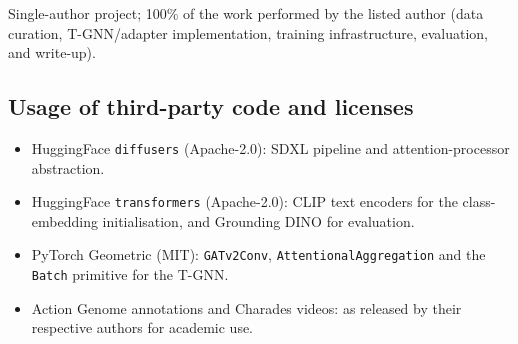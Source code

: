 \documentclass[11pt]{article}
\begin{document}
Single-author project; 100\% of the work performed by the
listed author (data curation, T-GNN/adapter implementation, training
infrastructure, evaluation, and write-up).

\subsection{Usage of third-party code and licenses}
\begin{itemize}[leftmargin=2em,itemsep=0.5pt]
\item HuggingFace \texttt{diffusers} (Apache-2.0): SDXL pipeline and
attention-processor abstraction.
\item HuggingFace \texttt{transformers} (Apache-2.0): CLIP text
encoders for the class-embedding initialisation, and Grounding DINO
for evaluation.
\item PyTorch Geometric (MIT): \texttt{GATv2Conv},
\texttt{AttentionalAggregation} and the \texttt{Batch} primitive for
the T-GNN.
\item Action Genome annotations and Charades videos: as released by
their respective authors for academic use.
\end{itemize}
\end{document}
